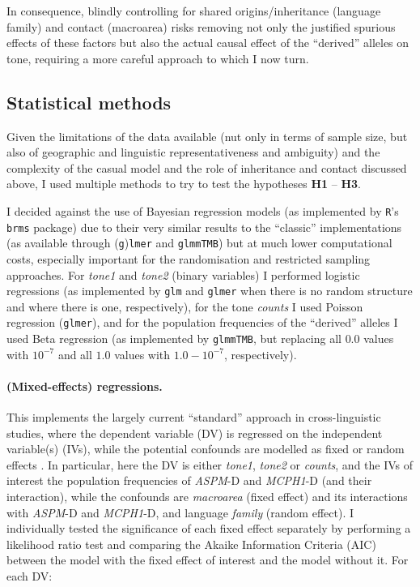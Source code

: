 \documentclass[twoside,twocolumn]{article}
\begin{document}
In consequence, blindly controlling for shared origins/inheritance (language family) and contact (macroarea) risks removing not only the justified spurious effects of these factors but also the actual causal effect of the ``derived'' alleles on tone, requiring a more careful approach to which I now turn.


\subsection{Statistical methods}

Given the limitations of the data available (nut only in terms of sample size, but also of geographic and linguistic representativeness and ambiguity) and the complexity of the casual model and the role of inheritance and contact discussed above, I used multiple methods to try to test the hypotheses \textbf{H1} -- \textbf{H3}.

I decided against the use of Bayesian regression models (as implemented by \texttt{R}'s \texttt{brms} package) due to their very similar results to the ``classic'' implementations (as available through (\texttt{g})\texttt{lmer} and \texttt{glmmTMB}) but at much lower computational costs, especially important for the randomisation and restricted sampling approaches.
For \textit{tone1} and \textit{tone2} (binary variables) I performed logistic regressions (as implemented by \texttt{glm} and \texttt{glmer} when there is no random structure and where there is one, respectively), for the tone \textit{counts} I used Poisson regression (\texttt{glmer}), and for the population frequencies of the ``derived'' alleles I used Beta regression (as implemented by \texttt{glmmTMB}, but replacing all $0.0$ values with $10^{-7}$ and all $1.0$ values with $1.0 - 10^{-7}$, respectively).

\paragraph{(Mixed-effects) regressions.}

This implements the largely current ``standard'' approach in cross-linguistic studies, where the dependent variable (DV) is regressed on the independent variable(s) (IVs), while the potential confounds are modelled as fixed or random effects \citep{ladd_correlational_2015,jaeger_mixed_2011}.
In particular, here the DV is either \textit{tone1}, \textit{tone2} or \textit{counts}, and the IVs of interest the population frequencies of \textit{ASPM}-D and \textit{MCPH1}-D (and their interaction), while the confounds are \textit{macroarea} (fixed effect) and its interactions with \textit{ASPM}-D and \textit{MCPH1}-D, and language \textit{family} (random effect).
I individually tested the significance of each fixed effect separately by performing a likelihood ratio test and comparing the Akaike Information Criteria (AIC) between the model with the fixed effect of interest and the model without it.
For each DV:
\end{document}
